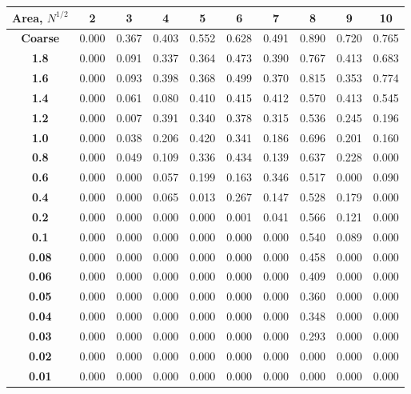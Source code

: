 \documentclass[letterpaper]{mandc2019}
\begin{document}
{\begin{table}[htb]
{\begin{tabular}{c|c|c|c|c|c|c|c|c|c}
\bf Area, $N^{1/2}$ & \bf  2 & \bf 3    &  \bf  4   &  \bf  5   &  \bf 6    &  \bf  7   &   \bf 8   &  \bf 9    &  \bf 10   \\ \hline \hline
\bf Coarse& 0.000 & 0.367 & 0.403 & 0.552 & 0.628 & 0.491 & 0.890 & 0.720 & 0.765 \\ \hline 
 \bf 1.8& 0.000 & 0.091 & 0.337 & 0.364 & 0.473 & 0.390 & 0.767 & 0.413 & 0.683 \\ \hline 
 \bf 1.6& 0.000 & 0.093 & 0.398 & 0.368 & 0.499 & 0.370 & 0.815 & 0.353 & 0.774 \\ \hline 
 \bf 1.4& 0.000 & 0.061 & 0.080 & 0.410 & 0.415 & 0.412 & 0.570 & 0.413 & 0.545 \\ \hline 
 \bf 1.2& 0.000 & 0.007 & 0.391 & 0.340 & 0.378 & 0.315 & 0.536 & 0.245 & 0.196 \\ \hline 
 \bf 1.0& 0.000 & 0.038 & 0.206 & 0.420 & 0.341 & 0.186 & 0.696 & 0.201 & 0.160 \\ \hline 
 \bf 0.8& 0.000 & 0.049 & 0.109 & 0.336 & 0.434 & 0.139 & 0.637 & 0.228 & 0.000 \\ \hline 
 \bf 0.6& 0.000 & 0.000 & 0.057 & 0.199 & 0.163 & 0.346 & 0.517 & 0.000 & 0.090 \\ \hline 
 \bf 0.4& 0.000 & 0.000 & 0.065 & 0.013 & 0.267 & 0.147 & 0.528 & 0.179 & 0.000 \\ \hline 
 \bf 0.2& 0.000 & 0.000 & 0.000 & 0.000 & 0.001 & 0.041 & 0.566 & 0.121 & 0.000 \\ \hline 
 \bf 0.1& 0.000 & 0.000 & 0.000 & 0.000 & 0.000 & 0.000 & 0.540 & 0.089 & 0.000 \\ \hline 
 \bf 0.08&0.000 & 0.000 & 0.000 & 0.000 & 0.000 & 0.000 & 0.458 & 0.000 & 0.000 \\ \hline 
 \bf 0.06&0.000 & 0.000 & 0.000 & 0.000 & 0.000 & 0.000 & 0.409 & 0.000 & 0.000 \\ \hline 
 \bf 0.05&0.000 & 0.000 & 0.000 & 0.000 & 0.000 & 0.000 & 0.360 & 0.000 & 0.000 \\ \hline 
 \bf 0.04&0.000 & 0.000 & 0.000 & 0.000 & 0.000 & 0.000 & 0.348 & 0.000 & 0.000 \\ \hline 
 \bf 0.03&0.000 & 0.000 & 0.000 & 0.000 & 0.000 & 0.000 & 0.293 & 0.000 & 0.000 \\ \hline 
 \bf 0.02&0.000 & 0.000 & 0.000 & 0.000 & 0.000 & 0.000 & 0.000 & 0.000 & 0.000 \\ \hline 
 \bf 0.01&0.000 & 0.000 & 0.000 & 0.000 & 0.000 & 0.000 & 0.000 & 0.000 & 0.000 \\ \hline 
\end{tabular}}
\scalebox{0.5}{
}
\end{table}}
\end{document}
